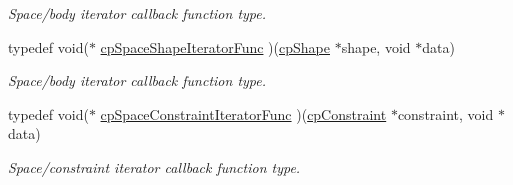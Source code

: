 \begin{DoxyCompactItemize}
\begin{DoxyCompactList}\small\item\em Space/body iterator callback function type. \end{DoxyCompactList}\item 
\hypertarget{group__cp_space_ga780ed0f29f957005efb4e24df64883b2}{typedef void($\ast$ \hyperlink{group__cp_space_ga780ed0f29f957005efb4e24df64883b2}{cp\-Space\-Shape\-Iterator\-Func} )(\hyperlink{structcp_shape}{cp\-Shape} $\ast$shape, void $\ast$data)}\label{group__cp_space_ga780ed0f29f957005efb4e24df64883b2}

\begin{DoxyCompactList}\small\item\em Space/body iterator callback function type. \end{DoxyCompactList}\item 
\hypertarget{group__cp_space_ga6818e027bac76ed80432f12ffc8d7a39}{typedef void($\ast$ \hyperlink{group__cp_space_ga6818e027bac76ed80432f12ffc8d7a39}{cp\-Space\-Constraint\-Iterator\-Func} )(\hyperlink{structcp_constraint}{cp\-Constraint} $\ast$constraint, void $\ast$data)}\label{group__cp_space_ga6818e027bac76ed80432f12ffc8d7a39}

\begin{DoxyCompactList}\small\item\em Space/constraint iterator callback function type. \end{DoxyCompactList}\end{DoxyCompactItemize}

